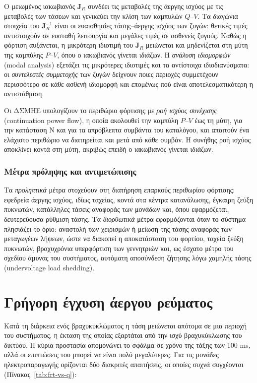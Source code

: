 Ο μειωμένος ιακωβιανός $\mathbf{J}_R$ συνδέει τις μεταβολές της άεργης ισχύος με τις
μεταβολές των τάσεων και γενικεύει την κλίση των καμπυλών $Q$--$V$. Τα διαγώνια στοιχεία του
$\mathbf{J}_R^{-1}$ είναι οι ευαισθησίες τάσης--άεργης ισχύος των ζυγών: θετικές τιμές
αντιστοιχούν σε ευσταθή λειτουργία και μεγάλες τιμές σε ασθενείς ζυγούς. Καθώς η φόρτιση
αυξάνεται, η μικρότερη ιδιοτιμή του $\mathbf{J}_R$ μειώνεται και μηδενίζεται στη μύτη της
καμπύλης $P$--$V$, όπου ο ιακωβιανός γίνεται ιδιάζων. Η \emph{ανάλυση ιδιομορφών} (modal
analysis) εξετάζει τις μικρότερες ιδιοτιμές και τα αντίστοιχα ιδιοδιανύσματα: οι
\emph{συντελεστές συμμετοχής} των ζυγών δείχνουν ποιες περιοχές συμμετέχουν περισσότερο σε
κάθε ασθενή ιδιομορφή και επομένως πού είναι αποτελεσματικότερη η αντιστάθμιση.

Οι ΔΣΜΗΕ υπολογίζουν το περιθώριο φόρτισης με \emph{ροή ισχύος συνέχισης} (continuation
power flow), η οποία ακολουθεί την καμπύλη $P$--$V$ έως τη μύτη, για την κατάσταση N και για τα
απρόβλεπτα συμβάντα του καταλόγου, και απαιτούν ένα ελάχιστο περιθώριο να διατηρείται και μετά
από κάθε συμβάν. Η συνήθης ροή ισχύος αποκλίνει κοντά στη μύτη, ακριβώς επειδή ο ιακωβιανός
γίνεται ιδιάζων.

\subsubsection{Μέτρα πρόληψης και αντιμετώπισης}

Τα \emph{προληπτικά} μέτρα στοχεύουν στη διατήρηση επαρκούς περιθωρίου φόρτισης: εφεδρεία
άεργης ισχύος, ιδίως ταχείας, κοντά στα κέντρα κατανάλωσης, έγκαιρη ζεύξη πυκνωτών, κατάλληλες
τάσεις αναφοράς των μονάδων και, όπου εφαρμόζεται, δευτερεύουσα ρύθμιση τάσης. Τα
\emph{διορθωτικά} μέτρα εφαρμόζονται όταν το σύστημα πλησιάζει το όριο: αναστολή των χειρισμών
ή μείωση της τάσης αναφοράς των μεταγωγέων λήψεων, ώστε να διακοπεί η αποκατάσταση του
φορτίου, ταχεία ζεύξη πυκνωτών, βραχυχρόνια υπερφόρτιση των γεννητριών και, ως έσχατο μέτρο του
σχεδίου άμυνας του συστήματος, αυτόματη αποσύνδεση ζήτησης λόγω χαμηλής τάσης (undervoltage
load shedding).

\section{Γρήγορη έγχυση άεργου ρεύματος}
\label{sec:frt}

Κατά τη διάρκεια ενός βραχυκυκλώματος η τάση μειώνεται απότομα σε μια περιοχή του συστήματος,
η έκταση της οποίας εξαρτάται από την ισχύ βραχυκύκλωσης του δικτύου. Η κύρια προστασία
απομονώνει το σφάλμα σε χρόνο της τάξης των 100 ms, αλλά οι επιπτώσεις του μπορεί να είναι
πολύ μεγαλύτερες. Για τις μονάδες ηλεκτροπαραγωγής ορίζονται δύο διακριτές απαιτήσεις, οι
οποίες συχνά συγχέονται (Πίνακας~\ref{tab:frt-vs-q}):

